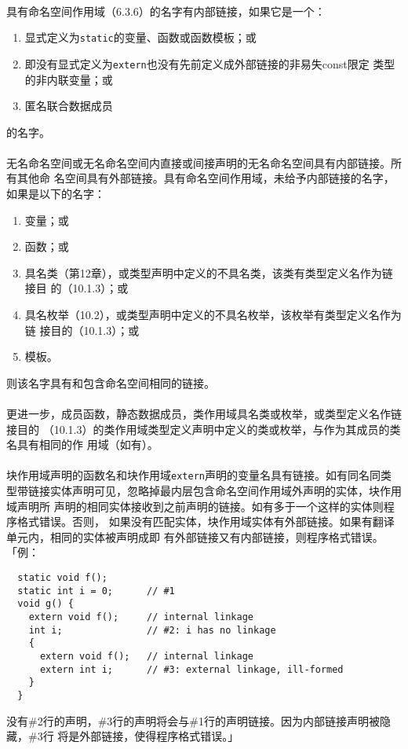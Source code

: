 \paragraph{}
具有命名空间作用域（6.3.6）的名字有内部链接，如果它是一个：
\begin{enumerate}
  \item{显式定义为\texttt{static}的变量、函数或函数模板；或}
  \item{即没有显式定义为\texttt{extern}也没有先前定义成外部链接的非易失const限定
    类型的非内联变量；或}
  \item{匿名联合数据成员}
\end{enumerate}的名字。

\paragraph{}
无名命名空间或无名命名空间内直接或间接声明的无名命名空间具有内部链接。所有其他命
名空间具有外部链接。具有命名空间作用域，未给予内部链接的名字，如果是以下的名字：
\begin{enumerate}
  \item{变量；或}
  \item{函数；或}
  \item{具名类（第12章），或类型声明中定义的不具名类，该类有类型定义名作为链接目
    的（10.1.3）；或}
  \item{具名枚举（10.2），或类型声明中定义的不具名枚举，该枚举有类型定义名作为链
    接目的（10.1.3）；或}
  \item{模板。}
\end{enumerate}则该名字具有和包含命名空间相同的链接。

\paragraph{}
更进一步，成员函数，静态数据成员，类作用域具名类或枚举，或类型定义名作链接目的
（10.1.3）的类作用域类型定义声明中定义的类或枚举，与作为其成员的类名具有相同的作
用域（如有）。

\paragraph{}
块作用域声明的函数名和块作用域\texttt{extern}声明的变量名具有链接。如有同名同类
型带链接实体声明可见，忽略掉最内层包含命名空间作用域外声明的实体，块作用域声明所
声明的相同实体接收到之前声明的链接。如有多于一个这样的实体则程序格式错误。否则，
如果没有匹配实体，块作用域实体有外部链接。如果有翻译单元内，相同的实体被声明成即
有外部链接又有内部链接，则程序格式错误。「例：
\begin{lstlisting}
  static void f();
  static int i = 0;      // #1
  void g() {
    extern void f();     // internal linkage
    int i;               // #2: i has no linkage
    {
      extern void f();   // internal linkage
      extern int i;      // #3: external linkage, ill-formed
    }
  }
\end{lstlisting}
没有\#2行的声明，\#3行的声明将会与\#1行的声明链接。因为内部链接声明被隐藏，\#3行
将是外部链接，使得程序格式错误。」

